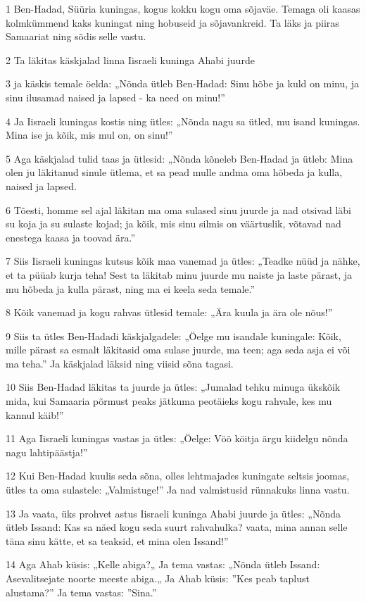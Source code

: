 \par 1 Ben-Hadad, Süüria kuningas, kogus kokku kogu oma sõjaväe. Temaga oli kaasas kolmkümmend kaks kuningat ning hobuseid ja sõjavankreid. Ta läks ja piiras Samaariat ning sõdis selle vastu.
\par 2 Ta läkitas käskjalad linna Iisraeli kuninga Ahabi juurde
\par 3 ja käskis temale öelda: „Nõnda ütleb Ben-Hadad: Sinu hõbe ja kuld on minu, ja sinu ilusamad naised ja lapsed - ka need on minu!”
\par 4 Ja Iisraeli kuningas kostis ning ütles: „Nõnda nagu sa ütled, mu isand kuningas. Mina ise ja kõik, mis mul on, on sinu!”
\par 5 Aga käskjalad tulid taas ja ütlesid: „Nõnda kõneleb Ben-Hadad ja ütleb: Mina olen ju läkitanud sinule ütlema, et sa pead mulle andma oma hõbeda ja kulla, naised ja lapsed.
\par 6 Tõesti, homme sel ajal läkitan ma oma sulased sinu juurde ja nad otsivad läbi su koja ja su sulaste kojad; ja kõik, mis sinu silmis on väärtuslik, võtavad nad enestega kaasa ja toovad ära.”
\par 7 Siis Iisraeli kuningas kutsus kõik maa vanemad ja ütles: „Teadke nüüd ja nähke, et ta püüab kurja teha! Sest ta läkitab minu juurde mu naiste ja laste pärast, ja mu hõbeda ja kulla pärast, ning ma ei keela seda temale.”
\par 8 Kõik vanemad ja kogu rahvas ütlesid temale: „Ära kuula ja ära ole nõus!”
\par 9 Siis ta ütles Ben-Hadadi käskjalgadele: „Öelge mu isandale kuningale: Kõik, mille pärast sa esmalt läkitasid oma sulase juurde, ma teen; aga seda asja ei või ma teha.” Ja käskjalad läksid ning viisid sõna tagasi.
\par 10 Siis Ben-Hadad läkitas ta juurde ja ütles: „Jumalad tehku minuga ükskõik mida, kui Samaaria põrmust peaks jätkuma peotäieks kogu rahvale, kes mu kannul käib!”
\par 11 Aga Iisraeli kuningas vastas ja ütles: „Öelge: Vöö köitja ärgu kiidelgu nõnda nagu lahtipäästja!”
\par 12 Kui Ben-Hadad kuulis seda sõna, olles lehtmajades kuningate seltsis joomas, ütles ta oma sulastele: „Valmistuge!” Ja nad valmistusid rünnakuks linna vastu.
\par 13 Ja vaata, üks prohvet astus Iisraeli kuninga Ahabi juurde ja ütles: „Nõnda ütleb Issand: Kas sa näed kogu seda suurt rahvahulka? vaata, mina annan selle täna sinu kätte, et sa teaksid, et mina olen Issand!”
\par 14 Aga Ahab küsis: „Kelle abiga?„ Ja tema vastas: „Nõnda ütleb Issand: Asevalitsejate noorte meeste abiga.„ Ja Ahab küsis: ”Kes peab taplust alustama?” Ja tema vastas: ”Sina.”
